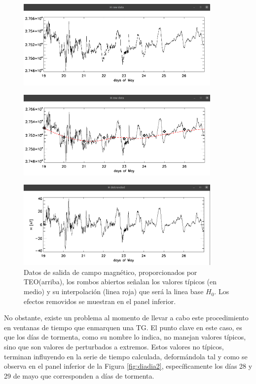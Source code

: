 \begin{figure}[h!]
    \centering
    \centerline{\Large \bf   
         \hfill}
          \centerline{\Large \bf   
         \hfill}
     \includegraphics[width=10.0cm]{Images/cap2/lineabase/diadia/paso1.1.png}
     \centerline{\Large \bf   
         \hfill}
     \includegraphics[width=10.0cm]{Images/cap2/lineabase/diadia/paso1.2.png}     
     \centerline{\Large \bf   
         \hfill}
      \includegraphics[width=10.0cm]{Images/cap2/lineabase/diadia/paso1.3.png}         
       \caption{Datos de salida de campo magnético, proporcionados por TEO(arriba), los rombos abiertos señalan los valores típicos (en medio) y su interpolación (linea roja) que será la linea base $H_0$. Los efectos removidos se muestran en el panel inferior.}
    \label{fig:diadia1}
\end{figure}

No obstante, existe un problema al momento de llevar a cabo este procedimiento en ventanas de tiempo que enmarquen una TG. El punto clave en este caso, es que los días de tormenta, como su nombre lo indica, no manejan valores típicos, sino que son valores de perturbados a extremos. Estos valores no típicos, terminan influyendo en la serie de tiempo calculada, deformándola tal y como se observa en el panel inferior de la Figura \ref{fig:diadia2}, específicamente los días 28 y 29 de mayo que corresponden a días de tormenta. 
\vspace{1 em}

